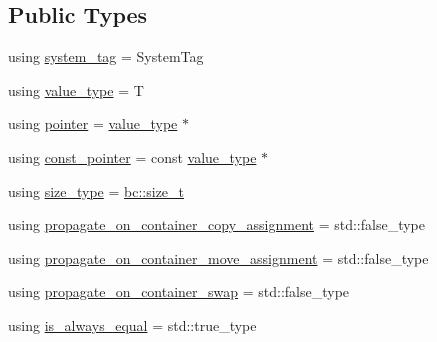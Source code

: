 \subsection*{Public Types}
\begin{DoxyCompactItemize}
\item 
using \hyperlink{structbc_1_1allocators_1_1Recycle__Allocator_a4a3cb90cf57efd82d70b09bbd020e1f4}{system\+\_\+tag} = System\+Tag
\item 
using \hyperlink{structbc_1_1allocators_1_1Recycle__Allocator_af461967c55249583cda104fdf7a79fc9}{value\+\_\+type} = T
\item 
using \hyperlink{structbc_1_1allocators_1_1Recycle__Allocator_ae0c8b71f7d2d0ae5cc5637659ca7bbb5}{pointer} = \hyperlink{structbc_1_1allocators_1_1Recycle__Allocator_af461967c55249583cda104fdf7a79fc9}{value\+\_\+type} $\ast$
\item 
using \hyperlink{structbc_1_1allocators_1_1Recycle__Allocator_a6dfe2b530915023ad4fe08cc1dc9de55}{const\+\_\+pointer} = const \hyperlink{structbc_1_1allocators_1_1Recycle__Allocator_af461967c55249583cda104fdf7a79fc9}{value\+\_\+type} $\ast$
\item 
using \hyperlink{structbc_1_1allocators_1_1Recycle__Allocator_a1fcc90170edb7f8892ff5a248a7f3ec4}{size\+\_\+type} = \hyperlink{namespacebc_aaf8e3fbf99b04b1b57c4f80c6f55d3c5}{bc\+::size\+\_\+t}
\item 
using \hyperlink{structbc_1_1allocators_1_1Recycle__Allocator_a7b02963c13d9f948b1d3895f8631e711}{propagate\+\_\+on\+\_\+container\+\_\+copy\+\_\+assignment} = std\+::false\+\_\+type
\item 
using \hyperlink{structbc_1_1allocators_1_1Recycle__Allocator_afa6ff49406bf1a2f2000d7353d2a4bb6}{propagate\+\_\+on\+\_\+container\+\_\+move\+\_\+assignment} = std\+::false\+\_\+type
\item 
using \hyperlink{structbc_1_1allocators_1_1Recycle__Allocator_afda64ab9ab1d07149055d69505a3cbd0}{propagate\+\_\+on\+\_\+container\+\_\+swap} = std\+::false\+\_\+type
\item 
using \hyperlink{structbc_1_1allocators_1_1Recycle__Allocator_a411361c7c7a3aadec6020692a32b774b}{is\+\_\+always\+\_\+equal} = std\+::true\+\_\+type
\end{DoxyCompactItemize}
